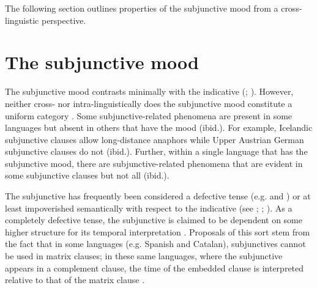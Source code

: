 \documentclass[output=paper,
modfonts,
newtxmath,
hidelinks,
]{langscibook}
\begin{document}
\ea \label{ex18}
\z\z

\noindent The following section outlines properties of the subjunctive mood from a cross-linguistic perspective. 

\section{The subjunctive mood}\label{s3}

The subjunctive mood contrasts minimally with the indicative (\citealt[660]{Quer2006}; \citealt[218]{Wiltschko}). However, neither cross- nor intra-linguistically does the subjunctive mood constitute a uniform category \citep[661]{Quer2006}. Some subjunctive-related phenomena are present in some languages but absent in others that have the mood (ibid.). For example, Icelandic subjunctive clauses allow long-distance anaphors while Upper Austrian German subjunctive clauses do not (ibid.). Further, within a single language that has the subjunctive mood, there are subjunctive-related phenomena that are evident in some subjunctive clauses but not all (ibid.).

The subjunctive has frequently been considered a defective tense (e.g. \citealt{Picallo1984} and \citealt{Giannakidou2009}) or at least impoverished semantically with respect to the indicative (see \citealt{Cowper2002}; \citealt{Cowper2005}; \citealt{Schlenker2005}). As a completely defective tense, the subjunctive is claimed to be dependent on some higher structure for its temporal interpretation \citep[2]{Wiltschko}. Proposals of this sort stem from the fact that in some languages (e.g. Spanish and Catalan), subjunctives cannot be used in matrix clauses; in these same languages, where the subjunctive appears in a complement clause, the time of the embedded clause is interpreted relative to that of the matrix clause \citep{Wiltschko}.\largerpage[-1]
\end{document}

